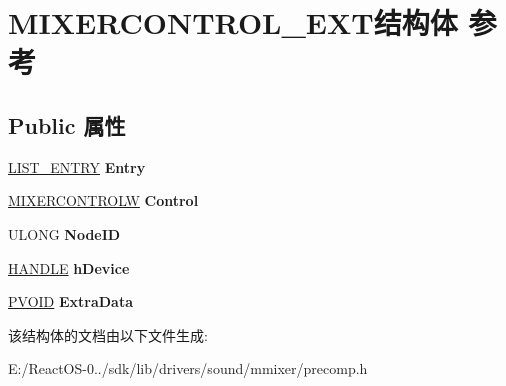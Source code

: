 \hypertarget{struct_m_i_x_e_r_c_o_n_t_r_o_l___e_x_t}{}\section{M\+I\+X\+E\+R\+C\+O\+N\+T\+R\+O\+L\+\_\+\+E\+X\+T结构体 参考}
\label{struct_m_i_x_e_r_c_o_n_t_r_o_l___e_x_t}
\subsection*{Public 属性}
\begin{DoxyCompactItemize}
\item 
\mbox{\label{struct_m_i_x_e_r_c_o_n_t_r_o_l___e_x_t_ac40b00513d4ad20d6e8ba85d8a28e580}} 
\hyperlink{struct___l_i_s_t___e_n_t_r_y}{L\+I\+S\+T\+\_\+\+E\+N\+T\+RY} {\bfseries Entry}
\item 
\mbox{\label{struct_m_i_x_e_r_c_o_n_t_r_o_l___e_x_t_a4e4abae7411666ceadbe80946d14ed30}} 
\hyperlink{structtag_m_i_x_e_r_c_o_n_t_r_o_l_w}{M\+I\+X\+E\+R\+C\+O\+N\+T\+R\+O\+LW} {\bfseries Control}
\item 
\mbox{\label{struct_m_i_x_e_r_c_o_n_t_r_o_l___e_x_t_a8c3210d6ef412ecf7ecd11d76f90354c}} 
U\+L\+O\+NG {\bfseries Node\+ID}
\item 
\mbox{\label{struct_m_i_x_e_r_c_o_n_t_r_o_l___e_x_t_a30421e0f5122c9534c28bc7d4736bebf}} 
\hyperlink{interfacevoid}{H\+A\+N\+D\+LE} {\bfseries h\+Device}
\item 
\mbox{\label{struct_m_i_x_e_r_c_o_n_t_r_o_l___e_x_t_a64c8d087ab28f8a30cea70e6a007215e}} 
\hyperlink{interfacevoid}{P\+V\+O\+ID} {\bfseries Extra\+Data}
\end{DoxyCompactItemize}


该结构体的文档由以下文件生成\+:\begin{DoxyCompactItemize}
\item 
E\+:/\+React\+O\+S-\/0../sdk/lib/drivers/sound/mmixer/precomp.\+h\end{DoxyCompactItemize}
